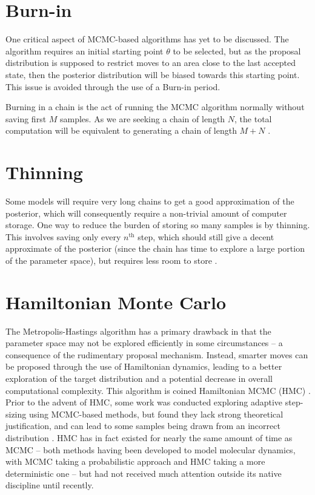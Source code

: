 \section{Burn-in}

    One critical aspect of MCMC-based algorithms has yet to be discussed. The algorithm requires an initial starting point $\theta$ to be selected, but as the proposal distribution is supposed to restrict moves to an area close to the last accepted state, then the posterior distribution will be biased towards this starting point. This issue is avoided through the use of a Burn-in period.

    Burning in a chain is the act of running the MCMC algorithm normally without saving first $M$ samples. As we are seeking a chain of length $N$, the total computation will be equivalent to generating a chain of length $M+N$ \cite{Andrieu2003}.


\section{Thinning}

    Some models will require very long chains to get a good approximation of the posterior, which will consequently require a non-trivial amount of computer storage. One way to reduce the burden of storing so many samples is by thinning. This involves saving only every $n^{\text{th}}$ step, which should still give a decent approximate of the posterior (since the chain has time to explore a large portion of the parameter space), but requires less room to store \cite{Link2012}.


\section{Hamiltonian Monte Carlo}

    The Metropolis-Hastings algorithm has a primary drawback in that the parameter space may not be explored efficiently in some circumstances -- a consequence of the rudimentary proposal mechanism. Instead, smarter moves can be proposed through the use of Hamiltonian dynamics, leading to a better exploration of the target distribution and a potential decrease in overall computational complexity. This algorithm is coined Hamiltonian MCMC (HMC) \cite{Neal2011}. Prior to the advent of HMC, some work was conducted exploring adaptive step-sizing using MCMC-based methods, but found they lack strong theoretical justification, and can lead to some samples being drawn from an incorrect distribution \cite{Neal2011}. HMC has in fact existed for nearly the same amount of time as MCMC -- both methods having been developed to model molecular dynamics, with MCMC taking a probabilistic approach and HMC taking a more deterministic one -- but had not received much attention outside its native discipline until recently.


